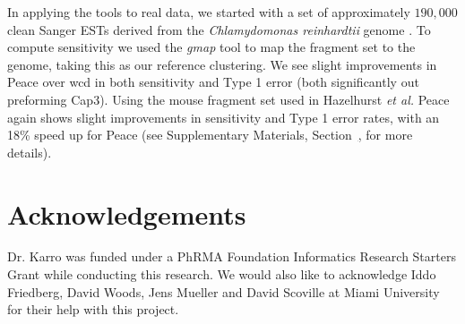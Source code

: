 \documentclass[a4,center,fleqn]{NAR}
\begin{document}
In applying the tools to real data, we started with a set of
approximately $190,000$ clean Sanger ESTs derived from the {\it
  Chlamydomonas reinhardtii} genome \cite{Liang2008}.  To compute
sensitivity we used the {\it gmap} tool \cite{Wu05} to map the
fragment set to the genome, taking this as our reference clustering.
We see slight improvements in {\sc Peace} over {\sc wcd} in both
sensitivity and Type 1 error (both significantly out preforming {\sc
  Cap3}).  Using the mouse fragment set used in Hazelhurst {\it et
  al.}  \cite{Hazelhurst08a} {\sc Peace} again shows slight
improvements in sensitivity and Type 1 error rates, with an 18\% speed
up for {\sc Peace} (see Supplementary Materials,
Section~\href{real_results}, for more details).

\section{Acknowledgements}

Dr. Karro was funded under a PhRMA Foundation Informatics Research
Starters Grant while conducting this research.  We would also like to
acknowledge Iddo Friedberg, David Woods, Jens Mueller and David
Scoville at Miami University for their help with this project.

\vspace{3mm}


\end{document}
